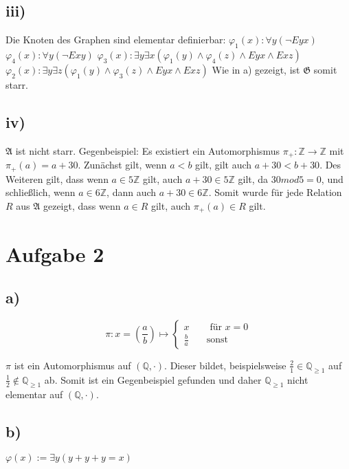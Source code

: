 \documentclass[11pt, a4paper]{article}
\begin{document}
\subsection*{iii)}
Die Knoten des Graphen sind elementar definierbar:\newline
$\varphi_1(x): \forall y (\neg Eyx)$\newline
$\varphi_4(x): \forall y (\neg Exy)$\newline
$\varphi_3(x): \exists y \exists x (\varphi_1(y) \land \varphi_4(z) \land Eyx \land Exz)$\newline
$\varphi_2(x): \exists y \exists z (\varphi_1(y) \land \varphi_3(z) \land Eyx \land Exz)$\newline
Wie in a) gezeigt, ist $\mathfrak{G}$ somit starr.

\subsection*{iv)}
$\mathfrak{A}$ ist nicht starr. Gegenbeispiel: Es existiert ein Automorphismus $\pi_+: \mathbb{Z} \to \mathbb{Z}$ mit $\pi_+(a) = a+30$. Zunächst gilt, wenn $a<b$ gilt, gilt auch $a+30<b+30$. Des Weiteren gilt, dass wenn $a \in 5\mathbb{Z}$ gilt, auch $a+30 \in 5\mathbb{Z}$ gilt, da $30 mod 5 = 0$, und schließlich, wenn $a\in 6\mathbb{Z}$, dann auch $a+30 \in 6\mathbb{Z}$. Somit wurde für jede Relation $R$ aus $\mathfrak{A}$ gezeigt, dass wenn $a\in R$ gilt, auch $\pi_+(a) \in R$ gilt.


\section*{Aufgabe 2}
\subsection*{a)}
\[
    \pi: x=\left(\frac{a}{b}\right) \mapsto \left\{
        \begin{array}{lr}
            x & \quad \text{ für } x = 0 \\
            \frac{b}{a} & \quad \text{sonst}
        \end{array}
    \right.
\]

$\pi$ ist ein Automorphismus auf $(\mathbb{Q}, \cdot)$.
Dieser bildet, beispielsweise $\frac{2}{1} \in \mathbb{Q}_{\geq 1}$ auf $\frac{1}{2} \notin \mathbb{Q}_{\geq 1}$ ab.
Somit ist ein Gegenbeispiel gefunden und daher $\mathbb{Q}_{\geq 1}$ nicht elementar auf $(\mathbb{Q}, \cdot)$.

\subsection*{b)}
$\varphi(x) := \exists y (y + y + y = x)$
\end{document}
